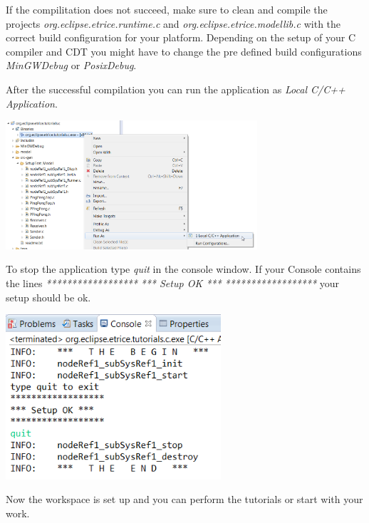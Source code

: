 If the compilitation does not succeed, make sure to clean and compile the projects \emph{org.eclipse.etrice.runtime.c} and \emph{org.eclipse.etrice.modellib.c} with the correct build configuration for your platform. Depending on the setup of your C compiler and CDT you might have to change the pre defined build configurations \emph{MinGWDebug} or \emph{PosixDebug}.

After the successful compilation you can run the application as \emph{Local C/C++ Application}.

\includegraphics[width=0.7\textwidth]{images/014-08-RunAsC-CPP-Application.png}

\newpage
To stop the application type \emph{quit} in the console window. If your Console contains the lines
\newline\emph{******************}
\newline\emph{*** Setup OK ***}
\newline\emph{******************} 
\newline your setup should be ok.

\includegraphics[width=0.6\textwidth]{images/014-09-ConsoleWithSetupOk.png} 

Now the workspace is set up and you can perform the tutorials or start with your work.

